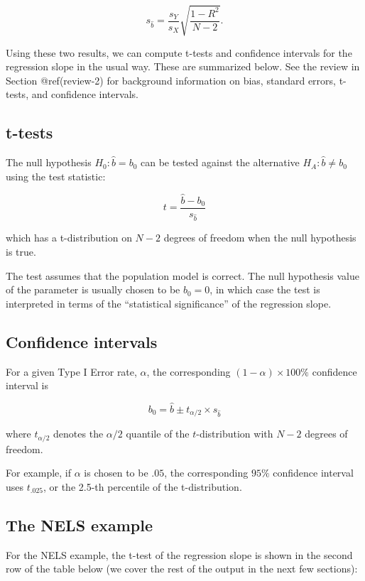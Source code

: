 \documentclass[
  letterpaper,
  DIV=11,
  numbers=noendperiod]{scrreprt}
\begin{document}
\[ s_{\widehat b} = \frac{s_Y}{s_X} \sqrt{\frac{1-R^2}{N-2}} . \]

Using these two results, we can compute t-tests and confidence intervals
for the regression slope in the usual way. These are summarized below.
See the review in Section @ref(review-2) for background information on
bias, standard errors, t-tests, and confidence intervals.

\hypertarget{t-tests-1}{%
\subsection{t-tests}\label{t-tests-1}}

The null hypothesis \(H_0: \widehat b = b_0\) can be tested against the
alternative \(H_A: \widehat b \neq b_0\) using the test statistic:

\[ t = \frac{\widehat b - b_0}{s_{\widehat b}} \]

which has a t-distribution on \(N-2\) degrees of freedom when the null
hypothesis is true.

The test assumes that the population model is correct. The null
hypothesis value of the parameter is usually chosen to be \(b_0 = 0\),
in which case the test is interpreted in terms of the ``statistical
significance'' of the regression slope.

\hypertarget{confidence-intervals-1}{%
\subsection{Confidence intervals}\label{confidence-intervals-1}}

For a given Type I Error rate, \(\alpha\), the corresponding
\((1-\alpha) \times 100\%\) confidence interval is

\[ b_0 = \widehat b \pm t_{\alpha/2} \times s_{\widehat b} \]

where \(t_{\alpha/2}\) denotes the \(\alpha/2\) quantile of the
\(t\)-distribution with \(N-2\) degrees of freedom.

For example, if \(\alpha\) is chosen to be \(.05\), the corresponding
\(95\%\) confidence interval uses \(t_{.025}\), or the 2.5-th percentile
of the t-distribution.

\hypertarget{the-nels-example}{%
\subsection{The NELS example}\label{the-nels-example}}

For the NELS example, the t-test of the regression slope is shown in the
second row of the table below (we cover the rest of the output in the
next few sections):
\end{document}
